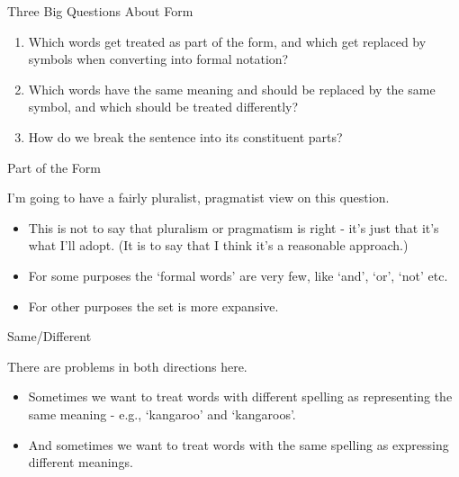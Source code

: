 \documentclass[
  ignorenonframetext,
]{beamer}
\providecommand{\tightlist}{%
  \setlength{\itemsep}{0pt}\setlength{\parskip}{0pt}}
\renewcommand{\,}{\text{, }}
\begin{document}
\begin{frame}{Three Big Questions About Form}
\protect\hypertarget{three-big-questions-about-form}{}

\begin{enumerate}[<+->]
\tightlist
\item
  Which words get treated as part of the form, and which get replaced by
  symbols when converting into formal notation?
\item
  Which words have the same meaning and should be replaced by the same
  symbol, and which should be treated differently?
\item
  How do we break the sentence into its constituent parts?
\end{enumerate}

\end{frame}

\begin{frame}{Part of the Form}
\protect\hypertarget{part-of-the-form}{}

I'm going to have a fairly pluralist, pragmatist view on this question.

\begin{itemize}
\tightlist
\item
  This is not to say that pluralism or pragmatism is right - it's just
  that it's what I'll adopt. (It is to say that I think it's a
  reasonable approach.)
\item
  For some purposes the `formal words' are very few, like `and', `or',
  `not' etc.
\item
  For other purposes the set is more expansive.
\end{itemize}

\end{frame}

\begin{frame}{Same/Different}
\protect\hypertarget{samedifferent}{}

There are problems in both directions here.

\begin{itemize}
\tightlist
\item
  Sometimes we want to treat words with different spelling as
  representing the same meaning - e.g., `kangaroo' and `kangaroos'.
\item
  And sometimes we want to treat words with the same spelling as
  expressing different meanings.
\end{itemize}

\end{frame}
\end{document}
